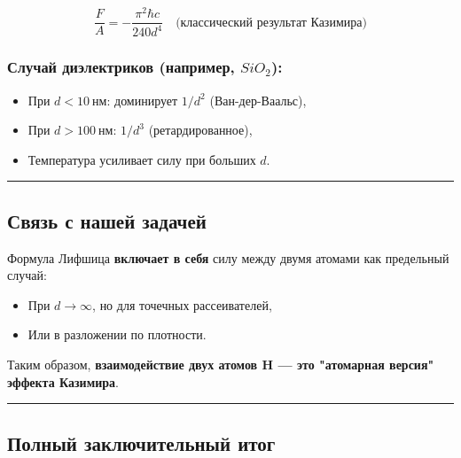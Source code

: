 \documentclass[11pt]{article}
\providecommand{\tightlist}{%
      \setlength{\itemsep}{0pt}\setlength{\parskip}{0pt}}
\begin{document}
\[
\frac{F}{A} = -\frac{\pi^2 \hbar c}{240 d^4}
\quad \text{(классический результат Казимира)}
\]

\subsubsection{\texorpdfstring{Случай диэлектриков (например,
\(SiO_2\)):}{Случай диэлектриков (например, SiO\_2):}}\label{ux441ux43bux443ux447ux430ux439-ux434ux438ux44dux43bux435ux43aux442ux440ux438ux43aux43eux432-ux43dux430ux43fux440ux438ux43cux435ux440-sio_2}

\begin{itemize}
\tightlist
\item
  При \(d < 10~\text{нм}\): доминирует \(1/d^2\) (Ван-дер-Ваальс),
\item
  При \(d > 100~\text{нм}\): \(1/d^3\) (ретардированное),
\item
  Температура усиливает силу при больших \(d\).
\end{itemize}

\begin{center}\rule{0.5\linewidth}{\linethickness}\end{center}

\subsection{Связь с нашей
задачей}\label{ux441ux432ux44fux437ux44c-ux441-ux43dux430ux448ux435ux439-ux437ux430ux434ux430ux447ux435ux439}

Формула Лифшица \textbf{включает в себя} силу между двумя атомами как
предельный случай:

\begin{itemize}
\tightlist
\item
  При \(d \to \infty\), но для точечных рассеивателей,
\item
  Или в разложении по плотности.
\end{itemize}

Таким образом, \textbf{взаимодействие двух атомов H --- это "атомарная
версия" эффекта Казимира}.

\begin{center}\rule{0.5\linewidth}{\linethickness}\end{center}

\subsection{Полный заключительный
итог}\label{ux43fux43eux43bux43dux44bux439-ux437ux430ux43aux43bux44eux447ux438ux442ux435ux43bux44cux43dux44bux439-ux438ux442ux43eux433}
\end{document}
